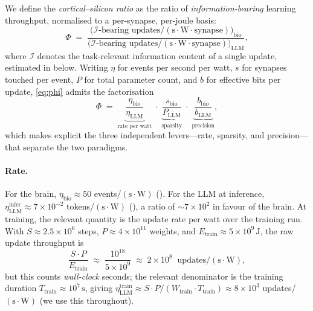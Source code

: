 \documentclass[11pt]{article}
\providecommand{\joule}{\ensuremath{\mathrm{J}}}
\providecommand{\second}{\ensuremath{\mathrm{s}}}
\theoremstyle{definition}
\theoremstyle{remark}
\newcommand{\InfoUp}{\mathcal{I}}
\newcommand{\Etrain}{E_{\mathrm{train}}}
\newcommand{\Wtrain}{W_{\mathrm{train}}}
\begin{document}
We define the \emph{cortical--silicon ratio} as the ratio of
\emph{information-bearing} learning throughput, normalised to a
per-synapse, per-joule basis:
\begin{equation}
  \Phi \;=\;
  \frac{\bigl(\InfoUp\text{-bearing updates}/(\mathrm{s}\cdot\mathrm{W}\cdot\mathrm{synapse})\bigr)_{\mathrm{bio}}}
       {\bigl(\InfoUp\text{-bearing updates}/(\mathrm{s}\cdot\mathrm{W}\cdot\mathrm{synapse})\bigr)_{\mathrm{LLM}}},
  \label{eq:phi}
\end{equation}
where $\InfoUp$ denotes the task-relevant information content of a
single update, estimated in  below.  Writing
$\eta$ for events per second per watt, $s$ for synapses touched per
event, $P$ for total parameter count, and $b$ for effective bits per
update, \cref{eq:phi} admits the factorisation
\begin{equation}
  \Phi \;=\;
  \underbrace{\frac{\eta_{\mathrm{bio}}}{\eta_{\mathrm{LLM}}}}_{\text{rate per watt}}
  \;\cdot\;
  \underbrace{\frac{s_{\mathrm{bio}}}{P_{\mathrm{LLM}}}}_{\text{sparsity}}
  \;\cdot\;
  \underbrace{\frac{b_{\mathrm{bio}}}{b_{\mathrm{LLM}}}}_{\text{precision}},
  \label{eq:phi-factored}
\end{equation}
which makes explicit the three independent levers---rate, sparsity,
and precision---that separate the two paradigms.

\paragraph{Rate.}
For the brain, $\eta_{\mathrm{bio}}\approx 50$ events/$(\mathrm{s}\cdot\mathrm{W})$
().  For the LLM at inference, $\eta_{\mathrm{LLM}}^{\mathrm{infer}}\approx 7\times 10^{-2}$ tokens/$(\mathrm{s}\cdot\mathrm{W})$ (), a ratio of $\sim\!7\times 10^{2}$ in favour of the brain.  At training, the relevant quantity is the update rate per watt over the training run.  With $S\approx 2.5\times 10^{6}$ steps, $P\approx 4\times 10^{11}$ weights, and $\Etrain\approx 5\times 10^{9}\,\si{\joule}$, the raw update throughput is
\[
  \frac{S\cdot P}{\Etrain}\;\approx\;\frac{10^{18}}{5\times 10^{9}}\;\approx\;2\times 10^{8}\;\;\text{updates}/(\mathrm{s}\cdot\mathrm{W}),
\]
but this counts \emph{wall-clock} seconds; the relevant denominator is the training duration $T_{\mathrm{train}}\approx 10^{7}\,\si{\second}$, giving $\eta_{\mathrm{LLM}}^{\mathrm{train}}\approx S\cdot P/(\Wtrain\cdot T_{\mathrm{train}})\approx 8\times 10^{3}$ updates/$(\mathrm{s}\cdot\mathrm{W})$ (we use this throughout).
\end{document}
